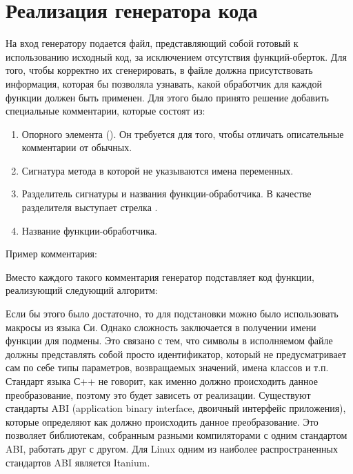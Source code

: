 \section{Реализация генератора кода}

На вход генератору подается файл, представляющий собой готовый к использованию
исходный код, за исключением отсутствия функций-оберток. Для того, чтобы
корректно их сгенерировать, в файле должна присутствовать информация, которая бы
позволяла узнавать, какой обработчик для каждой функции должен быть применен.
Для этого было принято решение добавить специальные комментарии, которые состоят
из:

\begin{enumerate}
	\item Опорного элемента (). Он требуется для того, чтобы
		отличать описательные комментарии от обычных.
	\item Сигнатура метода в которой не указываются имена переменных.
	\item Разделитель сигнатуры и названия функции-обработчика. В качестве
		разделителя выступает стрелка \code{->}.
	\item Название функции-обработчика.
\end{enumerate}

Пример комментария: 

Вместо каждого такого комментария генератор подставляет код функции, реализующий
следующий алгоритм:

\begin{algorithm}[H]
\end{algorithm}

Если бы этого было достаточно, то для подстановки можно было использовать
макросы из языка Си. Однако сложность заключается в получении имени функции для
подмены. Это связано с тем, что символы в исполняемом файле должны представлять
собой просто идентификатор, который не предусматривает сам по себе типы
параметров, возвращаемых значений, имена классов и т.п.
Стандарт языка С++ не говорит, как именно должно происходить данное
преобразование, поэтому это будет зависеть от реализации. Существуют стандарты
ABI (application binary interface, двоичный интерфейс приложения), которые
определяют как должно происходить данное преобразование. Это позволяет
библиотекам, собранным разными компиляторами с одним стандартом ABI, работать
друг с другом. Для Linux одним из наиболее распространенных стандартов ABI
является Itanium\cite{itaniumabi}.

